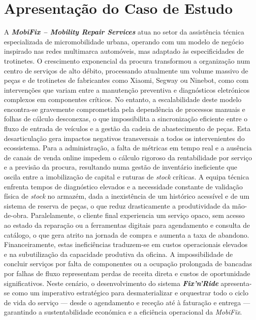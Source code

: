 \documentclass[a4paper,12pt]{scrreprt}
\begin{document}
\section{Apresentação do Caso de Estudo}
A \textit{\textbf{MobiFix -- Mobility Repair Services}} atua no setor da assistência técnica especializada de micromobilidade urbana, operando com um modelo de negócio inspirado nas redes multimarca automóveis, mas adaptado às especificidades de trotinetes. O crescimento exponencial da procura transformou a organização num centro de serviços de alto débito, processando atualmente um volume massivo de peças e de trotinetes de fabricantes como Xiaomi, Segway ou Ninebot, como com intervenções que variam entre a manutenção preventiva e diagnósticos eletrónicos complexos em componentes críticos. No entanto, a escalabilidade deste modelo encontra-se gravemente comprometida pela dependência de processos manuais e folhas de cálculo desconexas, o que impossibilita a sincronização eficiente entre o fluxo de entrada de veículos e a gestão da cadeia de abastecimento de peças. Esta desarticulação gera impactos negativos transversais a todos os intervenientes do ecossistema. Para a administração, a falta de métricas em tempo real e a ausência de canais de venda online impedem o cálculo rigoroso da rentabilidade por serviço e a previsão da procura, resultando numa gestão de inventário ineficiente que oscila entre a imobilização de capital e ruturas de \textit{stock} críticas. A equipa técnica enfrenta tempos de diagnóstico elevados e a necessidade constante de validação física de \textit{stock} no armazém, dada a inexistência de um histórico acessível e de um sistema de reserva de peças, o que reduz drasticamente a produtividade da mão-de-obra. Paralelamente, o cliente final experiencia um serviço opaco, sem acesso ao estado da reparação ou a ferramentas digitais para agendamento e consulta de catálogo, o que gera atrito na jornada de compra e aumenta a taxa de abandono. Financeiramente, estas ineficiências traduzem-se em custos operacionais elevados e na subutilização da capacidade produtiva da oficina. A impossibilidade de concluir serviços por falta de componentes ou a ocupação prolongada de bancadas por falhas de fluxo representam perdas de receita direta e custos de oportunidade significativos. Neste cenário, o desenvolvimento do sistema \textit{\textbf{Fix'n'Ride}} apresenta-se como um imperativo estratégico para desmaterializar e orquestrar todo o ciclo de vida do serviço — desde o agendamento e receção até à faturação e entrega — garantindo a sustentabilidade económica e a eficiência operacional da \textit{MobiFix}. 
\end{document}

